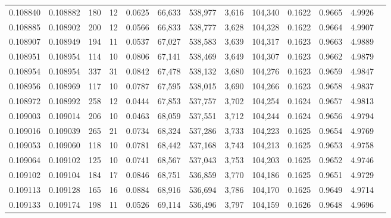 \begin{tabular}{rrrrrrrrrrrrr}
0.108840 & 0.108882 &   180 &  12 &                                     0.0625 &  66,633 & 538,977 &   3,616 & 104,340 & 0.1622 & 0.9665 & 4.9926 \\
0.108885 & 0.108902 &   200 &  12 &                                     0.0566 &  66,833 & 538,777 &   3,628 & 104,328 & 0.1622 & 0.9664 & 4.9907 \\
0.108907 & 0.108949 &   194 &  11 &                                     0.0537 &  67,027 & 538,583 &   3,639 & 104,317 & 0.1623 & 0.9663 & 4.9889 \\
0.108951 & 0.108954 &   114 &  10 &                                     0.0806 &  67,141 & 538,469 &   3,649 & 104,307 & 0.1623 & 0.9662 & 4.9879 \\
0.108954 & 0.108954 &   337 &  31 &                                     0.0842 &  67,478 & 538,132 &   3,680 & 104,276 & 0.1623 & 0.9659 & 4.9847 \\
0.108956 & 0.108969 &   117 &  10 &                                     0.0787 &  67,595 & 538,015 &   3,690 & 104,266 & 0.1623 & 0.9658 & 4.9837 \\
0.108972 & 0.108992 &   258 &  12 &                                     0.0444 &  67,853 & 537,757 &   3,702 & 104,254 & 0.1624 & 0.9657 & 4.9813 \\
0.109003 & 0.109014 &   206 &  10 &                                     0.0463 &  68,059 & 537,551 &   3,712 & 104,244 & 0.1624 & 0.9656 & 4.9794 \\
0.109016 & 0.109039 &   265 &  21 &                                     0.0734 &  68,324 & 537,286 &   3,733 & 104,223 & 0.1625 & 0.9654 & 4.9769 \\
0.109053 & 0.109060 &   118 &  10 &                                     0.0781 &  68,442 & 537,168 &   3,743 & 104,213 & 0.1625 & 0.9653 & 4.9758 \\
0.109064 & 0.109102 &   125 &  10 &                                     0.0741 &  68,567 & 537,043 &   3,753 & 104,203 & 0.1625 & 0.9652 & 4.9746 \\
0.109102 & 0.109104 &   184 &  17 &                                     0.0846 &  68,751 & 536,859 &   3,770 & 104,186 & 0.1625 & 0.9651 & 4.9729 \\
0.109113 & 0.109128 &   165 &  16 &                                     0.0884 &  68,916 & 536,694 &   3,786 & 104,170 & 0.1625 & 0.9649 & 4.9714 \\
0.109133 & 0.109174 &   198 &  11 &                                     0.0526 &  69,114 & 536,496 &   3,797 & 104,159 & 0.1626 & 0.9648 & 4.9696 \\

\end{tabular}
